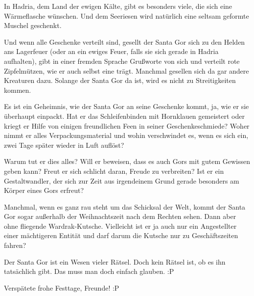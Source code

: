 \documentclass[10pt, a4paper, oneside]{book}
\begin{document}
In Hadria, dem Land der ewigen Kälte, gibt es besonders viele, die sich eine Wärmeflasche wünschen. Und dem Seeriesen wird natürlich eine seltsam geformte Muschel geschenkt.

Und wenn alle Geschenke verteilt sind, gesellt der Santa Gor sich zu den Helden ans Lagerfeuer (oder an ein ewiges Feuer, falls sie sich gerade in Hadria aufhalten), gibt in einer fremden Sprache Grußworte von sich und verteilt rote Zipfelmützen, wie er auch selbst eine trägt. Manchmal gesellen sich da gar andere Kreaturen dazu. Solange der Santa Gor da ist, wird es nicht zu Streitigkeiten kommen.

Es ist ein Geheimnis, wie der Santa Gor an seine Geschenke kommt, ja, wie er sie überhaupt einpackt. Hat er das Schleifenbinden mit Hornklauen gemeistert oder kriegt er Hilfe von einigen freundlichen Feen in seiner Geschenkeschmiede? Woher nimmt er alles Verpackungsmaterial und wohin verschwindet es, wenn es sich ein, zwei Tage später wieder in Luft auflöst?

Warum tut er dies alles? Will er beweisen, dass es auch Gors mit gutem Gewissen geben kann? Freut er sich schlicht daran, Freude zu verbreiten? Ist er ein Gestaltwandler, der sich zur Zeit aus irgendeinem Grund gerade besonders am Körper eines Gors erfreut?

Manchmal, wenn es ganz rau steht um das Schicksal der Welt, kommt der Santa Gor sogar außerhalb der Weihnachtszeit nach dem Rechten sehen. Dann aber ohne fliegende Wardrak-Kutsche. Vielleicht ist er ja auch nur ein Angestellter einer mächtigeren Entität und darf darum die Kutsche nur zu Geschäftszeiten fahren?

Der Santa Gor ist ein Wesen vieler Rätsel. Doch kein Rätsel ist, ob es ihn tatsächlich gibt. Das muss man doch einfach glauben. :P\bigskip



Verspätete frohe Festtage, Freunde! :P
\end{document}
